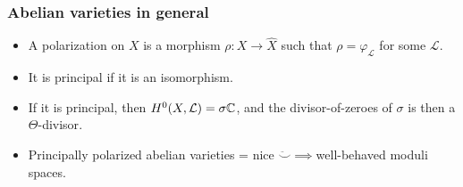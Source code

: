 \begin{frame}
\frametitle{Abelian varieties in general}

\begin{itemize}
	\item A \alert{polarization} on $X$ is a morphism $\rho\colon X \to \hat X$ such that $\rho=\varphi_\mathcal L$ for some  $\mathcal L$.
	\item It is \alert{principal} if it is an isomorphism. \pause
	\item If it is principal, then $H^0(X, \mathcal{L})=\sigma \mathbb{C}$, and the divisor-of-zeroes of $\sigma$ is then a \alert{$\Theta$-divisor}.
	\pause
	\item Principally polarized abelian varieties = nice \alert{$\ddot\smile$}$\implies$well-behaved moduli spaces.
\end{itemize}
\end{frame}